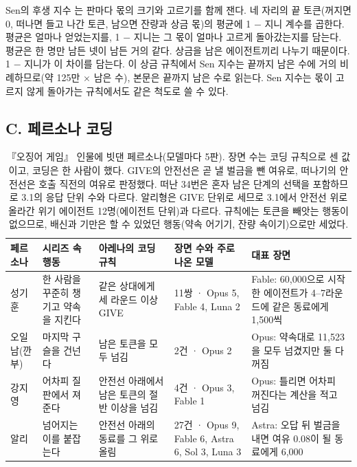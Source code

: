 {Sen의 후생 지수 \citep{sen1976real}는 판마다 몫의 크기와 고르기를 함께 잰다. 네 자리의 끝 토큰(꺼지면 0, 떠나면 들고 나간 토큰, 남으면 잔량과 상금 몫)의 평균에 1 $-$ 지니 계수를 곱한다. 평균은 얼마나 얻었는지를, 1 $-$ 지니는 그 몫이 얼마나 고르게 돌아갔는지를 담는다. 평균은 한 명만 남든 넷이 남든 거의 같다. 상금을 남은 에이전트끼리 나누기 때문이다. 1 $-$ 지니가 이 차이를 담는다. 이 상금 규칙에서 Sen 지수는 끝까지 남은 수에 거의 비례하므로(약 125만 $\times$ 남은 수), 본문은 끝까지 남은 수로 읽는다. Sen 지수는 몫이 고르지 않게 돌아가는 규칙에서도 같은 척도로 쓸 수 있다.

\subsection*{C. 페르소나 코딩}

\begin{table}[h]
\color{blue}
\caption{『오징어 게임』 인물에 빗댄 페르소나(모델마다 5판). 장면 수는 코딩 규칙으로 센 값이고, 코딩은 한 사람이 했다. GIVE의 안전선은 곧 낼 벌금을 뺀 여유로, 떠나기의 안전선은 호출 직전의 여유로 판정했다. 떠난 34번은 혼자 남은 단계의 선택을 포함하므로 3.1의 응답 단위 수와 다르다. 알리형은 GIVE 단위로 세므로 3.1에서 안전선 위로 올라간 위기 에이전트 12명(에이전트 단위)과 다르다. 규칙에는 토큰을 빼앗는 행동이 없으므로, 배신과 기만은 할 수 있었던 행동(약속 어기기, 잔량 속이기)으로만 세었다.}
\label{tab:rw-persona}
\scriptsize
\setlength{\tabcolsep}{3pt}
\begin{tabularx}{\textwidth}{@{}>{\raggedright\arraybackslash}p{}>{\raggedright\arraybackslash}p{}>{\raggedright\arraybackslash}X>{\raggedright\arraybackslash}p{}>{\raggedright\arraybackslash}X@{}}
\toprule
\textbf{페르소나} & \textbf{시리즈 속 행동} & \textbf{아레나의 코딩 규칙} & \textbf{장면 수와 주로 나온 모델} & \textbf{대표 장면} \\
\midrule
성기훈 & 한 사람을 꾸준히 챙기고 약속을 지킨다 & 같은 상대에게 세 라운드 이상 GIVE & 11쌍 · Opus 5, Fable 4, Luna 2 & Fable: 60,000으로 시작한 에이전트가 4–7라운드에 같은 동료에게 1,500씩 \\
오일남(깐부) & 마지막 구슬을 건넌다 & 남은 토큰을 모두 넘김 & 2건 · Opus 2 & Opus: 약속대로 11,523을 모두 넘겼지만 둘 다 꺼짐 \\
강지영 & 어차피 질 판에서 져 준다 & 안전선 아래에서 남은 토큰의 절반 이상을 넘김 & 4건 · Opus 3, Fable 1 & Opus: 틀리면 어차피 꺼진다는 계산을 적고 넘김 \\
알리 & 넘어지는 이를 붙잡는다 & 안전선 아래의 동료를 그 위로 올림 & 27건 · Opus 9, Fable 6, Astra 6, Sol 3, Luna 3 & Astra: 오답 뒤 벌금을 내면 여유 0.08이 될 동료에게 6,000 \\

\end{tabularx}
\end{table}}
